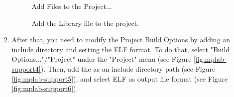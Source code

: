 \begin{enumerate}
\begin{enumerate}
%
\begin{figure}[htb]
\caption{Add Files to the Project...}
\label{fig:mplab-support2}
\end{figure}
%
\begin{figure}[htb]
\caption{Add the Library file to the project.}
\label{fig:mplab-support3}
\end{figure}

  \item
    After that, you need to modify the Project Build Options by adding
    an include directory and setting the ELF format. To do that,
    select "Build Options..."/"Project" under the "Project" menu (see
    Figure \ref{fig:mplab-support4}). Then, add the
     as an include directory path (see Figure
    \ref{fig:mplab-support5}), and select ELF as output file format
    (see Figure \ref{fig:mplab-support6}).


\end{enumerate}
\end{enumerate}
